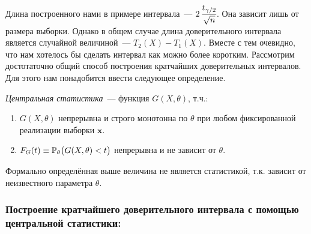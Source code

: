 Длина построенного нами в примере интервала~--- $2\, \cfrac{t_{\gamma / 2}}{\sqrt{n}}$.
Она зависит лишь от размера выборки.
Однако в общем случае длина доверительного интервала является случайной величиной~--- $T_2(X) - T_1(X)$.
Вместе с тем очевидно, что нам хотелось бы сделать интервал как можно более коротким.
Рассмотрим достотаточно общий способ построения кратчайших доверительных интервалов.
Для этого нам понадобится ввести следующее определение.

\begin{defn}
    \textit{Центральная статистика}~--- функция $G(X,\theta)$, т.ч.:
    \begin{enumerate}
        \item $G(X,\theta)$ непрерывна и строго монотонна по $\theta$ при любом фиксированной реализации выборки $\boldsymbol{x}$. 
        \item $F_G (t) \equiv \operatorname{\operatorname{\mathbb{P}}_{\theta}} \bigl(G(X, \theta) < t\bigr)$ непрерывна и не зависит от $\theta$.
    \end{enumerate}
\end{defn}

\begin{rmrk}
    Формально определённая выше величина не является статистикой, т.к. зависит от неизвестного параметра $\theta$.
\end{rmrk}

\subsubsection{Построение кратчайшего доверительного интервала с помощью центральной статистики:}

